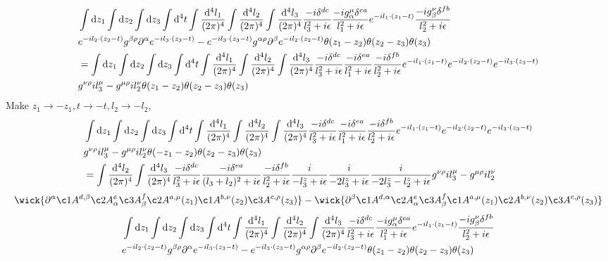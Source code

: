 \documentclass{article}
\DeclarePairedDelimiter\bracketM{[}{]}
\let\bqty\relax
\newcommand{\bqty}[1]{\bracketM*{#1}}
\newcommand{\mm}[1]{\frac{\dd^4#1}{(2\pi)^4}}
\begin{document}
\begin{align*}
	&\int\dd z_1\int\dd z_2\int\dd z_3\int\dd^4 t
	\int\mm{l_1}\int\mm{l_2}\int\mm{l_3}\frac{-i\delta^{dc}}{l_3^2+i\epsilon}\frac{-ig_{\alpha}^{\mu}\delta^{ea}}{l_1^2+i\epsilon}e^{-il_1\cdot(z_1-t)}\frac{-ig_{\beta}^{\nu}\delta^{fb}}{l_2^2+i\epsilon}\\&
	\bqty{e^{-il_2\cdot(z_2-t)}g^{\beta\rho}\partial^{\alpha}e^{-il_3\cdot(z_3-t)}-e^{-il_3\cdot(z_3-t)}g^{\alpha\rho}\partial^{\beta}e^{-il_2\cdot(z_2-t)}}
	\theta(z_1-z_2)\theta(z_2-z_3)\theta(z_3)\\ 
	&=\int\dd z_1\int\dd z_2\int\dd z_3\int\dd^4 t
	\int\mm{l_1}\int\mm{l_2}\int\mm{l_3}\frac{-i\delta^{dc}}{l_3^2+i\epsilon}\frac{-i\delta^{ea}}{l_1^2+i\epsilon}\frac{-i\delta^{fb}}{l_2^2+i\epsilon}e^{-il_1\cdot(z_1-t)}e^{-il_2\cdot(z_2-t)}e^{-il_3\cdot(z_3-t)}\\&
	\bqty{g^{\nu\rho}il_3^{\mu}-g^{\mu\rho}il_2^{\nu}}
	\theta(z_1-z_2)\theta(z_2-z_3)\theta(z_3)
\end{align*}
Make $z_1\to-z_1,t\to-t,l_2\to-l_2$, 
\begin{align*}
	&\int\dd z_1\int\dd z_2\int\dd z_3\int\dd^4 t
	\int\mm{l_1}\int\mm{l_2}\int\mm{l_3}\frac{-i\delta^{dc}}{l_3^2+i\epsilon}\frac{-i\delta^{ea}}{l_1^2+i\epsilon}\frac{-i\delta^{fb}}{l_2^2+i\epsilon}e^{-il_1\cdot(z_1-t)}e^{-il_2\cdot(z_2-t)}e^{-il_3\cdot(z_3-t)}\\&
	\bqty{g^{\nu\rho}il_3^{\mu}-g^{\mu\rho}il_2^{\nu}}
	\theta(-z_1-z_2)\theta(z_2-z_3)\theta(z_3)\\
	&=\int\mm{l_2}\int\mm{l_3}\frac{-i\delta^{dc}}{l_3^2+i\epsilon}\frac{-i\delta^{ea}}{(l_3+l_2)^2+i\epsilon}\frac{-i\delta^{fb}}{l_2^2+i\epsilon}\frac{i}{-l_3^z+i\epsilon}\frac{i}{-2l_3^z+i\epsilon}\frac{i}{-2l_3^z-l_2^z+i\epsilon}\bqty{g^{\nu\rho}il_3^{\mu}-g^{\mu\rho}il_2^{\nu}}
\end{align*}
\begin{align*}
	\wick{\partial^{\alpha} \c1A^{d,\beta} \c2A^{e}_{\alpha} \c3A^{f}_{\beta}\c2A^{a,\mu}(z_1)\c1A^{b,\nu}(z_2)\c3A^{c,\rho}(z_3)}-\wick{\partial^{\beta} \c1A^{d,\alpha} \c2A^{e}_{\alpha} \c3A^{f}_{\beta}\c1A^{a,\mu}(z_1)\c2A^{b,\nu}(z_2)\c3A^{c,\rho}(z_3)}
\end{align*}
\begin{align*}
	&\int\dd z_1\int\dd z_2\int\dd z_3\int\dd^4 t\int\mm{l_1}\int\mm{l_2}\int\mm{l_3}\frac{-i\delta^{dc}}{l_3^2+i\epsilon}\frac{-ig_{\alpha}^{\mu}\delta^{ea}}{l_1^2+i\epsilon}e^{-il_1\cdot(z_1-t)}\frac{-ig_{\beta}^{\nu}\delta^{fb}}{l_2^2+i\epsilon}\\&
	\bqty{e^{-il_2\cdot(z_2-t)}g^{\beta\rho}\partial^{\alpha}e^{-il_3\cdot(z_3-t)}-e^{-il_3\cdot(z_3-t)}g^{\alpha\rho}\partial^{\beta}e^{-il_2\cdot(z_2-t)}}
	\theta(z_1-z_2)\theta(z_2-z_3)\theta(z_3)
\end{align*}
\end{document}
